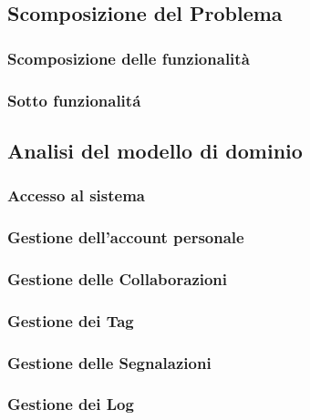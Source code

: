 \documentclass{article}
\begin{document}
\subsection{Scomposizione del Problema}
\subsubsection{Scomposizione delle funzionalità}

\subsubsection{Sotto funzionalitá}


\subsection{Analisi del modello di dominio}
\subsubsection{Accesso al sistema}

\subsubsection{Gestione dell'account personale}

\subsubsection{Gestione delle Collaborazioni}

\subsubsection{Gestione dei Tag}

\subsubsection{Gestione delle Segnalazioni}

\subsubsection{Gestione dei Log}



\pagebreak


\end{document}

